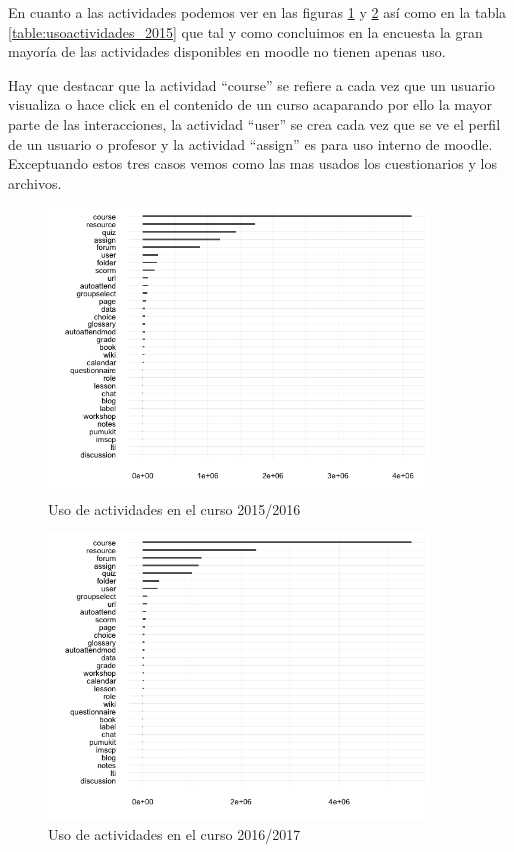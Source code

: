 En cuanto a las actividades podemos ver en las figuras \ref{fig:usoactividades_2015} y \ref{fig:usoactividades_2016} así como en la tabla \ref{table:usoactividades_2015} que tal y como concluimos en la encuesta la gran mayoría de las actividades disponibles en moodle no tienen apenas uso. 

\bigskip
Hay que destacar que la actividad ``course'' se refiere a cada vez que un usuario visualiza o hace click en el contenido de un curso acaparando por ello la mayor parte de las interacciones, la actividad ``user'' se crea cada vez que se ve el perfil de un usuario o profesor y la actividad ``assign'' es para uso interno de moodle. Exceptuando estos tres casos vemos como las mas usados los cuestionarios y los archivos.

\begin{figure}[H]
\centering
\includegraphics[width=0.9\textwidth]{../r/usoactividades_2015}
\caption{Uso de actividades en el curso 2015/2016}
\label{fig:usoactividades_2015}
\end{figure}

\begin{figure}[H]
\centering
\includegraphics[width=0.9\textwidth]{../r/usoactividades_2016}
\caption{Uso de actividades en el curso 2016/2017}
\label{fig:usoactividades_2016}
\end{figure}

